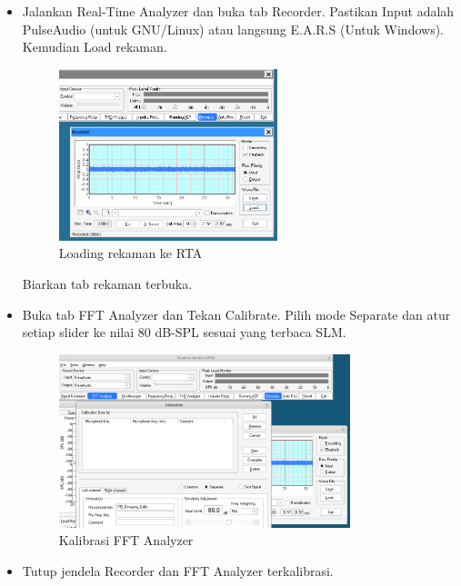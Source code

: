 \documentclass{article}
\begin{document}
	\begin{itemize}
		\item Jalankan Real-Time Analyzer dan buka tab Recorder.
		Pastikan Input adalah PulseAudio (untuk GNU/Linux) atau langsung E.A.R.S (Untuk Windows).
		Kemudian Load rekaman.
		
		\begin{figure}[H]
			\centering
			\includegraphics[width=0.6\textwidth,angle=0]{images/rta_load}
			\caption{Loading rekaman ke RTA}
		\end{figure}
	
		Biarkan tab rekaman terbuka.
	
		\item Buka tab FFT Analyzer dan Tekan Calibrate.
		Pilih mode Separate dan atur setiap slider ke nilai 80 dB-SPL sesuai yang terbaca SLM.
		
		\begin{figure}[H]
			\centering
			\includegraphics[width=0.8\textwidth,angle=0]{images/rta_calib}
			\caption{Kalibrasi FFT Analyzer}
		\end{figure}
	
		\item Tutup jendela Recorder dan FFT Analyzer terkalibrasi.
		

\end{itemize}
\end{document}
